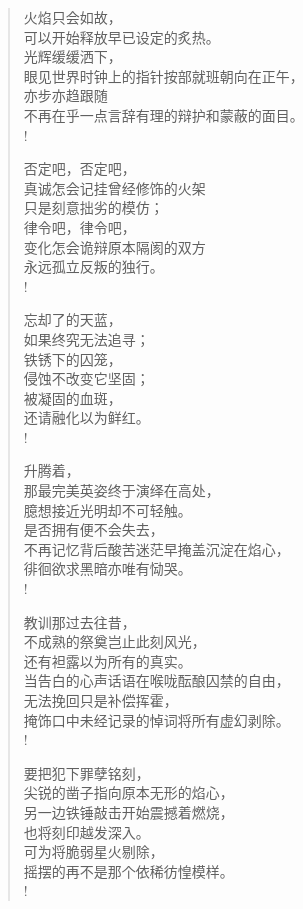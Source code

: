 \documentclass[UTF8, 12pt, a4paper]{ctexrep} %
\begin{document}
\begin{verse}
    火焰只会如故，\\
    可以开始释放早已设定的炙热。\\
    光辉缓缓洒下，\\
    眼见世界时钟上的指针按部就班朝向在正午，\\
    亦步亦趋跟随\\
    不再在乎一点言辞有理的辩护和蒙蔽的面目。\\!

    否定吧，否定吧，\\
    真诚怎会记挂曾经修饰的火架\\
    只是刻意拙劣的模仿；\\
    律令吧，律令吧，\\
    变化怎会诡辩原本隔阂的双方\\
    永远孤立反叛的独行。\\!

    忘却了的天蓝，\\
    如果终究无法追寻；\\
    铁锈下的囚笼，\\
    侵蚀不改变它坚固；\\
    被凝固的血斑，\\
    还请融化以为鲜红。\\!

    升腾着，\\
    那最完美英姿终于演绎在高处，\\
    臆想接近光明却不可轻触。\\
    是否拥有便不会失去，\\
    不再记忆背后酸苦迷茫早掩盖沉淀在焰心，\\
    徘徊欲求黑暗亦唯有恸哭。\\!

    教训那过去往昔，\\
    不成熟的祭奠岂止此刻风光，\\
    还有袒露以为所有的真实。\\
    当告白的心声话语在喉咙酝酿囚禁的自由，\\
    无法挽回只是补偿挥霍，\\
    掩饰口中未经记录的悼词将所有虚幻剥除。\\!

    要把犯下罪孽铭刻，\\
    尖锐的凿子指向原本无形的焰心，\\
    另一边铁锤敲击开始震撼着燃烧，\\
    也将刻印越发深入。\\
    可为将脆弱星火剔除，\\
    摇摆的再不是那个依稀彷惶模样。\\!


\end{verse}
\end{document}
